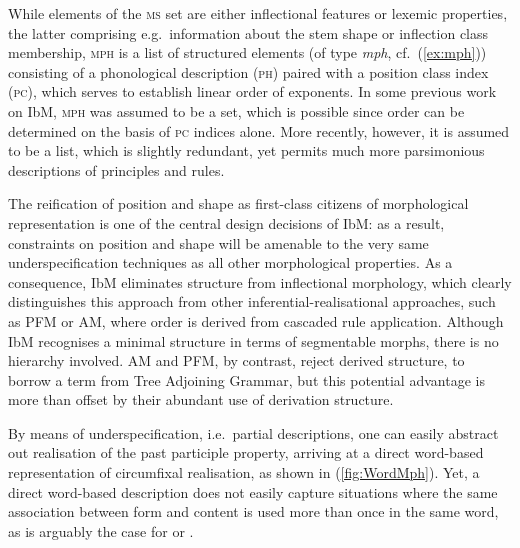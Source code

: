 \documentclass[output=paper
 	        ,biblatex
                ,babelshorthands
                ,newtxmath
                ,draftmode
                ,colorlinks, citecolor=brown
]{langscibook}
\begin{document}
\begin{exe}
\begin{xlist}
\begin{exe}
\begin{xlist}
  \end{xlist}
\end{exe}
While elements of the \textsc{ms} set
are either inflectional features or lexemic properties, the latter
comprising e.g.\ information about the stem shape or inflection class
membership, \textsc{mph} is a list of structured elements (of type
\textit{mph}, cf.~(\ref{ex:mph})) consisting
of a phonological description (\textsc{ph}) paired with a position
class index (\textsc{pc}), which serves to establish linear order of
exponents. In some previous work on IbM, \textsc{mph} was assumed to
be a set, which is possible since order can be determined on the basis
of \textsc{pc} indices alone. More recently, however, it is assumed to
be a list, which is slightly redundant, yet permits much more
parsimonious descriptions of principles and rules.

\begin{exe}
  \ex \label{ex:mph} 
\end{exe}

The reification of position and shape as first-class citizens of
morphological representation is one of the central design decisions of
IbM: as a result, constraints on position and shape will be amenable
to the very same underspecification techniques as all other
morphological properties. As a consequence, IbM eliminates structure
from inflectional morphology, which clearly distinguishes this
approach from other inferential-realisational approaches, such as PFM
or AM, where order is derived from cascaded rule application.
Although IbM recognises a minimal structure in terms of segmentable
morphs, there is no hierarchy involved. AM and PFM, by contrast,
reject derived structure, to borrow a term from Tree Adjoining
Grammar, but this potential advantage is more than offset by their
abundant use of derivation structure.

By means of underspecification, i.e.\ partial descriptions, one can
easily abstract out realisation of the past participle property,
arriving at a direct word-based representation of circumfixal
realisation, as shown in (\ref{fig:WordMph}).  Yet, a direct
word-based description does not easily capture situations where the
same association between form and content is used more than once in
the same word, as is arguably the case for 
\citep{Stump93,Crysmann:Bonami:2016,Crysmann:Bonami:2017:HPSG} or  \citep{Harris09,Crysmann:2018:Batsbi}.


\end{xlist}
\end{exe}
\end{document}
